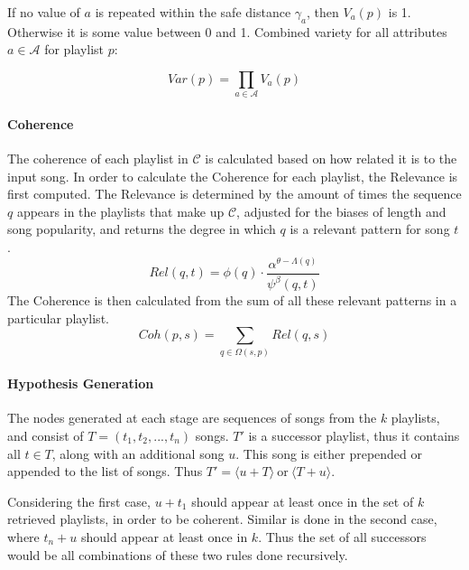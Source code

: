 \documentclass[a4paper, 12pt]{report}
\begin{document}
If no value of \(a\) is repeated within the safe distance \(\gamma_a\), then \(V_a(p)\) is 1. Otherwise it is some value between 0 and 1.
Combined variety for all attributes \(a \in \mathcal{A}\) for playlist \(p\):

\[Var(p) = \prod_{a\in\mathcal{A}} V_a(p)\]

\paragraph{Coherence}
The coherence of each playlist in \(\mathcal{C}\) is calculated based on how related it is to the input song. 
In order to calculate the Coherence for each playlist, the Relevance is first computed. 
The Relevance is determined by the amount of times the sequence \(q\) appears in the playlists that make up \(\mathcal{C}\), 
adjusted for the biases of length and song popularity, and returns the degree in which \(q\) is a relevant pattern for song \(t\).
\[Rel(q, t) = \phi(q) \cdot \frac{\alpha^{\theta-\Lambda(q)}}{\psi^\beta(q, t)} \]
The Coherence is then calculated from the sum of all these relevant patterns in a particular playlist.
\[Coh(p, s) = \sum_{q\in\Omega(s, p)} Rel(q, s) \]

\paragraph{Hypothesis Generation}
The nodes generated at each stage are sequences of songs from the \(k\) playlists, and consist of \(T = (t_1, t_2, ..., t_n)\) songs. 
\(T'\) is a successor playlist, thus it contains all \(t \in T\), along with an additional song \(u\). This song is either prepended or appended to the list 
of songs. Thus \(T' = \langle u + T \rangle\ \text{or}\ \langle T + u \rangle\).

Considering the first case, \(u + t_1\) should appear at least once in the set of \(k\) retrieved playlists, in order to be coherent. Similar is done 
in the second case, where \(t_n + u\) should appear at least once in \(k\). Thus the set of all successors would be all combinations of these two rules done recursively.
\end{document}
